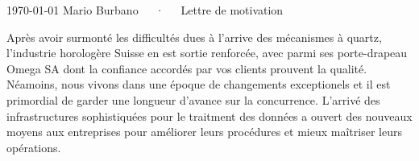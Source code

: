\documentclass[11pt, a4paper]{awesome-cv}
\begin{document}
\makecvheader[R]

\makecvfooter
  {\today}
  {Mario Burbano~~~·~~~Lettre de motivation}
  {}

\makelettertitle

\begin{cvletter}

\begin{comment}
Description du poste
Analyser les données horlogères et mettre les résultats sous forme visuelle --> articles scientifiques
Participer activement à l’amélioration et à l’innovation des produits --> Je suis passionné par la mise en œuvre de systèmes de traitement de données et par la façon dont ils peuvent faciliter le processus de prise de décision basée sur les données.
Rechercher et développer des outils de caractérisation et d’aide à l’analyse des données de contrôle
Participer à la mise en place des structures de données de contrôle des montres et des mouvements
Créer les standards de données horlogères du département
Construire des plans d’expérience pour vérifier certaines données
Gérer des projets d’amélioration de la remonté des données

Profil
Formation de Technicien avec expérience dans l’analyse des données ou formation universitaire dans le domaine de l’ingénierie ou de l’informatique (Ingénieur EPFL)
Expérience en gestion de projets
Maîtrise des logiciels self BI comme Power Bi
Connaissances des outils ETL
Expérience confirmée en SQL et en programmation
Passionné par les données et les techniques innovantes d’analyse (Big data, IA, etc.)
Langue maternelle française et bonne maîtrise de la langue anglaise
Personne dynamique, autonome, rigoureuse, ouverte d'esprit, apte à travailler en équipe et ayant le sens de la communication --> com = présentation des résultats en conf


Langues
Langue maternelle française et bonne maîtrise de la langue anglaise
\end{comment}

Après avoir surmonté les difficultés dues à l'arrive des mécanismes à quartz, 
l'industrie horologère Suisse en est sortie renforcée, avec parmi ses porte-drapeau Omega SA dont la confiance accordés par vos clients prouvent la qualité. 
Néamoins, nous vivons dans une époque de changements exceptionels et il est primordial de garder une longueur d'avance sur la concurrence. 
L'arrivé des infrastructures sophistiquées pour le traitment des données a ouvert des nouveaux moyens aux entreprises pour améliorer leurs procédures et 
mieux maîtriser leurs opérations.


\end{cvletter}
\end{document}
